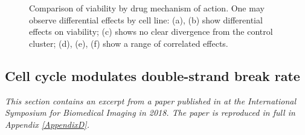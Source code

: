 \begin{figure}
    \qquad
    \qquad
\caption{Comparison of viability by drug mechanism of action. One may observe differential effects by cell line: (a), (b) show differential effects on viability; (c) shows no clear divergence from the control cluster; (d), (e), (f) show a range of correlated effects.}
\label{fig:viability_moas}
\end{figure}

\subsection{Cell cycle modulates double-strand break rate}
\label{subsec:multivariate}

\emph{This section contains an excerpt from a paper published in at the International Symposium for Biomedical Imaging in 2018. The paper is reproduced in full in Appendix \ref{AppendixD}.}

